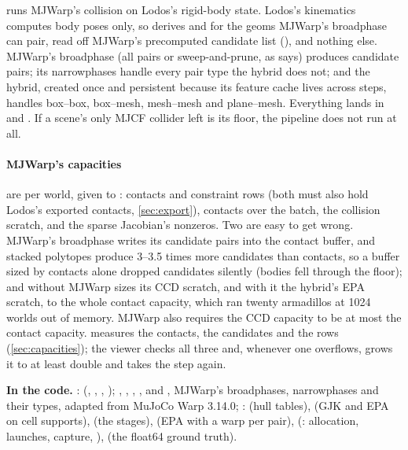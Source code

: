  runs MJWarp's collision on Lodos's rigid-body state. Lodos's kinematics computes body poses only, so  derives  and  for the geoms MJWarp's broadphase can pair, read off MJWarp's precomputed candidate list (), and nothing else. MJWarp's broadphase (all pairs or sweep-and-prune, as  says) produces candidate pairs; its narrowphases handle every pair type the hybrid does not; and the hybrid, created once and persistent because its feature cache lives across steps, handles box--box, box--mesh, mesh--mesh and plane--mesh. Everything lands in  and . If a scene's only MJCF collider left is its floor, the pipeline does not run at all.

\paragraph{MJWarp's capacities} are per world, given to :  contacts and  constraint rows (both must also hold Lodos's exported contacts, \cref{sec:export}),  contacts over the batch,  the collision scratch, and  the sparse Jacobian's nonzeros. Two are easy to get wrong. MJWarp's broadphase writes its candidate pairs into the contact buffer, and stacked polytopes produce 3--3.5 times more candidates than contacts, so a buffer sized by contacts alone dropped candidates silently (bodies fell through the floor); and without  MJWarp sizes its CCD scratch, and with it the hybrid's EPA scratch, to the whole contact capacity, which ran twenty armadillos at 1024 worlds out of memory. MJWarp also requires the CCD capacity to be at most the contact capacity.  measures the contacts, the candidates and the rows (\cref{sec:capacities}); the viewer checks all three and, whenever one overflows, grows it to at least double and takes the step again.

\begin{codebox}
\textbf{In the code.} :  (, , , ); , , , ,  and , MJWarp's broadphases, narrowphases and their types, adapted from MuJoCo Warp 3.14.0; :  (hull tables),  (GJK and EPA on cell supports),  (the stages),  (EPA with a warp per pair),  (: allocation, launches, capture, ),  (the float64 ground truth).
\end{codebox}

